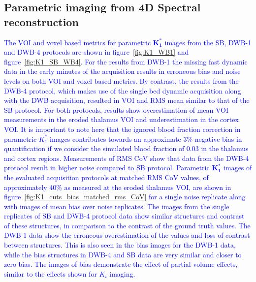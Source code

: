 \subsection*{Parametric  imaging from 4D Spectral reconstruction}
\textcolor{blue}{
The VOI and voxel based metrics for parametric $\boldsymbol{K_1^*}$ images from the SB, DWB-1 and DWB-4 protocols are shown in figure~\ref{fig:K1_WB1} and figure~\ref{fig:K1_SB_WB4}. For the results from DWB-1 the missing fast dynamic data in the early minutes of the acquisition results in erroneous bias and noise levels on both VOI and voxel based metrics. By contrast, the results from the DWB-4 protocol, which makes use of the single bed dynamic acquisition along with the DWB acquisition, resulted in VOI and RMS mean similar to that of the SB protocol. For both protocols, results show overestimation of mean VOI measurements in the eroded thalamus VOI and underestimation in the cortex VOI. It is important to note here that the ignored blood fraction correction in parametric $K_1^*$ images contributes towards an approximate 3\% negative bias in quantification if we consider the simulated blood fraction of 0.03 in the thalamus and cortex regions.
Measurements of RMS CoV show that data from the DWB-4 protocol result in higher noise compared to SB protocol.
Parametric $\boldsymbol{K_1^*}$ images of the evaluated acquisition protocols at matched RMS CoV values, of approximately 40\% as measured at the eroded thalamus VOI, are shown in figure~\ref{fig:K1_cuts_bias_matched_rms_CoV} for a single noise replicate along with images of mean bias over noise replicates. The images from the single replicates of SB and DWB-4 protocol data show similar structures and contrast of these structures, in comparison to the contrast of the ground truth values. The DWB-1 data show the erroneous overestimation of the values and loss of contrast between structures. This is also seen in the bias images for the DWB-1 data, while the bias structures in DWB-4 and SB data are very similar and closer to zero bias. The images of bias demonstrate the effect of partial volume effects, similar to the effects shown for $K_i$ imaging.}

